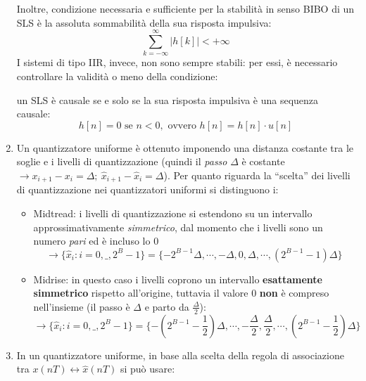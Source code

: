 \documentclass[
]{article}
\begin{document}
\begin{enumerate}
  Inoltre, condizione necessaria e sufficiente per la stabilità in senso
  BIBO di un SLS è la assoluta sommabilità della sua risposta impulsiva:
  \[
  \sum_{k=-\infty}^{\infty}\Big|h[k]\Big| < +\infty
  \] I sistemi di tipo IIR, invece, non sono sempre stabili: per essi, è
  necessario controllare la validità o meno della condizione:

  un SLS è causale se e solo se la sua risposta impulsiva è una sequenza
  causale: \[
  h[n] = 0 \text{ se } n < 0, \text{ ovvero } h[n] = h[n] \cdot u[n]
  \]
\item
  Un quantizzatore uniforme è ottenuto imponendo una distanza costante
  tra le soglie e i livelli di quantizzazione (quindi il \emph{passo}
  \(\Delta\) è costante
  \(\to x_{i+1}-x_i=\Delta; \ \hat{x}_{i+1}-\hat{x}_i = \Delta\)). Per
  quanto riguarda la ``scelta'' dei livelli di quantizzazione nei
  quantizzatori uniformi si distinguono i:

  \begin{itemize}
  \item
    Midtread: i livelli di quantizzazione si estendono su un intervallo
    approssimativamente \emph{simmetrico}, dal momento che i livelli
    sono un numero \emph{pari} ed è incluso lo 0 \[
    \to \{\hat{x}_i : i=0,\_,2^B -1\}= \{-2^{B-1}\Delta,\cdots,-\Delta,0,\Delta,\cdots,(2^{B-1}-1)\Delta \}
    \]
  \item
    Midrise: in questo caso i livelli coprono un intervallo
    \textbf{esattamente simmetrico} rispetto all'origine, tuttavia il
    valore 0 \textbf{non} è compreso nell'insieme (il passo è \(\Delta\)
    e parto da \(\frac{\Delta}{2}\)): \[
    \to \{\hat{x}_i : i=0,\_,2^B -1\}= \{-(2^{B-1}-\frac{1}{2})\Delta,\cdots,-\frac{\Delta}{2},\frac{\Delta}{2},\cdots,(2^{B-1}-\frac{1}{2})\Delta \}
    \]
  \end{itemize}
\item
  In un quantizzatore uniforme, in base alla scelta della regola di
  associazione tra \(x(nT)\leftrightarrow \hat{x}(nT)\) si può usare:


\end{enumerate}
\end{document}
